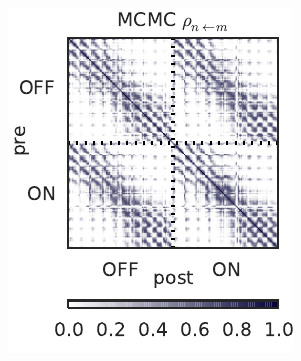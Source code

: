 \begin{figure}[t!]
\begin{subfigure}[b]{1.8in}
    \includegraphics[width=\textwidth]{figures/ch3/synth_rgc_mcmc_prob_conn.pdf}
    \label{fig:synth_rgc_mcmc_prob_conn}
  \end{subfigure}
  ~
  \begin{subfigure}[b]{1.8in}
    \centering
    \caption{}
    \vspace{-.25in}

\end{subfigure}
\end{figure}

